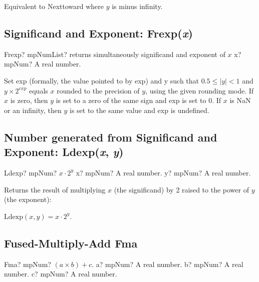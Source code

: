 \vspace{0.3cm}
Equivalent to Nexttoward where $y$ is minus infinity.




\subsection{Significand and Exponent: Frexp(\textit{x})}

\begin{mpFunctionsExtract}
	\mpFunctionOne
	{Frexp? mpNumList? returns simultaneously significand and exponent of $x$}
	{x? mpNum? A real number.}
\end{mpFunctionsExtract}

\vspace{0.3cm}
Set exp (formally, the value pointed to by exp) and y such that $0.5 \leq |y| < 1$ and $y \times 2^{exp}$ equals $x$ rounded to the precision of $y$, using the given rounding mode. If $x$ is zero, then $y$ is set to a zero of the same sign and exp is set to 0. If $x$ is NaN or an infinity, then $y$ is set to the same value and exp is undefined.



\subsection{Number generated from Significand and Exponent: Ldexp(\textit{x}, \textit{y})}

\begin{mpFunctionsExtract}
	\mpFunctionTwo
	{Ldexp? mpNum? $x \cdot 2^{y}$}
	{x? mpNum? A real number.}
	{y? mpNum? A real number.}
\end{mpFunctionsExtract}

\vspace{0.3cm}
Returns the result of multiplying $x$ (the significand) by 2 raised to the power of $y$ (the exponent): 

$\text{Ldexp}(x,y) = x \cdot 2^{y}$.




\subsection{Fused-Multiply-Add Fma}

\begin{mpFunctionsExtract}
	\mpFunctionThree
	{Fma? mpNum? $(a \times b) + c$.}
	{a? mpNum? A real number.}
	{b? mpNum? A real number.}
	{c? mpNum? A real number.}
\end{mpFunctionsExtract}


